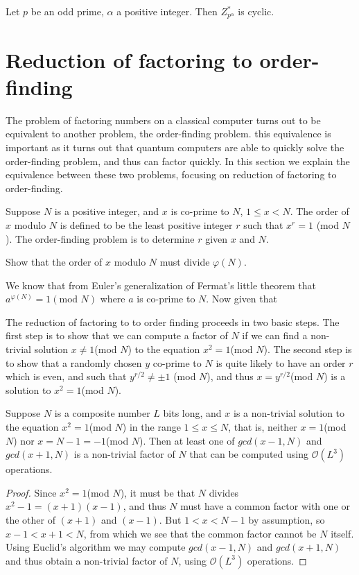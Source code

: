 \begin{theorem}
    Let $p$ be an odd prime, $\alpha$ a positive integer. Then $Z_{p^{\alpha}}^*$ is cyclic.
\end{theorem}

\section{Reduction of factoring to order-finding}
The problem of factoring numbers on a classical computer turns out to be equivalent to another problem, the order-finding problem. this equivalence is important as it turns out that quantum computers are able to quickly solve the order-finding problem, and thus can factor quickly. In this section we explain the equivalence between these two problems, focusing on reduction of factoring to order-finding.

Suppose $N$ is a positive integer, and $x$ is co-prime to $N$, $1\leq x <N$. The order of $x$ modulo $N$ is defined to be the least positive integer $r$ such that $x^r =1$ (mod $N$). The order-finding problem is to determine $r$ given $x$ and $N$.

\begin{example}
    Show that the order of $x$ modulo $N$ must divide $\varphi(N)$.

    We know that from Euler's generalization of Fermat's little theorem that $a^{\varphi(N)} = 1 (\text{mod }N)$ where $a$ is co-prime to $N$. Now given that 
\end{example}
The reduction of factoring to to order finding proceeds in two basic steps. The first step is to show that we can compute a factor of $N$ if we can find a non-trivial solution $x\neq 1$(mod $N$) to the equation $x^2 = 1$(mod $N$). The second step is to show that a randomly chosen $y$ co-prime to $N$ is quite likely to have an order $r$ which is even, and such that $y^{r/2} \neq \pm1$ (mod $N$), and thus $x=y^{r/2}$(mod $N$) is a solution to $x^2=1$(mod $N$).

\begin{theorem}
    Suppose $N$ is a composite number $L$ bits long, and $x$ is a non-trivial solution to the equation $x^2=1$(mod $N$) in the range $1\leq x \leq N$, that is, neither $x =1$(mod $N$) nor $x=N-1=-1$(mod $N$). Then at least one of $gcd(x-1,N)$ and $gcd(x+1,N)$ is a non-trivial factor of $N$ that can be computed using $\mathcal{O}(L^3)$ operations.
\end{theorem}
\begin{proof}
    Since $x^2=1$(mod $N$), it must be that $N$ divides $x^2-1=(x+1)(x-1)$, and thus $N$ must have a common factor with one or the other of $(x+1)$ and $(x-1)$. But $1<x<N-1$ by assumption, so $x-1<x+1<N$, from which we see that the common factor cannot be $N$ itself. Using Euclid's algorithm we may compute $gcd(x-1,N)$ and $gcd(x+1,N)$ and thus obtain a non-trivial factor of $N$, using $\mathcal{O}(L^3)$ operations.
\end{proof}

